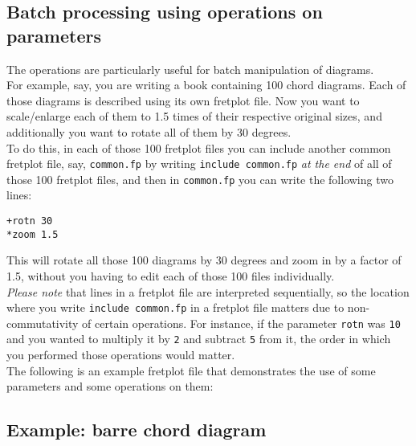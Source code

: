 \documentclass[12pt,letterpaper]{article}
\begin{document}
\subsection{Batch processing using operations on parameters}

The operations are particularly useful for batch manipulation of diagrams.\\

For example, say, you are writing a book containing 100 chord diagrams. Each of those diagrams is described using its own fretplot file. Now you want to scale/enlarge each of them to 1.5 times of their respective original sizes, and additionally you want to rotate all of them by 30 degrees.\\

To do this, in each of those 100 fretplot files you can include another common fretplot file, say, \texttt{common.fp} by writing \texttt{include common.fp} \textit{at the end} of all of those 100 fretplot files, and then in \texttt{common.fp} you can write the following two lines:\\

\begin{lstlisting}[language=fretplot]
+rotn 30
*zoom 1.5
\end{lstlisting}

This will rotate all those 100 diagrams by 30 degrees and zoom in by a factor of 1.5, without you having to edit each of those 100 files individually.\\

\textit{Please note} that lines in a fretplot file are interpreted sequentially, so the location where you write \texttt{include common.fp} in a fretplot file matters due to non-commutativity of certain operations. For instance, if the parameter \texttt{rotn} was \texttt{10} and you wanted to multiply it by \texttt{2} and subtract \texttt{5} from it, the order in which you performed those operations would matter.\\

The following is an example fretplot file that demonstrates the use of some parameters and some operations on them:\\



\subsection{Example: barre chord diagram}
\end{document}
